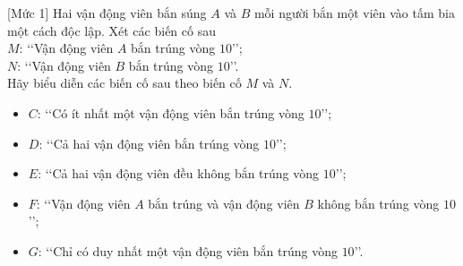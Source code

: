 \begin{bt}%
[Mức 1]
	Hai vận động viên bắn súng $A$ và $B$ mỗi người bắn một viên vào tấm bia một cách độc lập. Xét các biến  cố sau\\
	$M$: \lq\lq Vận động viên $A$ bắn trúng vòng $10$\rq\rq;\\
	$N$: \lq\lq Vận động viên $B$ bắn trúng vòng $10$\rq\rq.\\
	Hãy biểu diễn các biến cố sau theo biến cố $M$ và $N$.
	\begin{itemize}
		\item $C$: \lq\lq Có ít nhất một vận động viên bắn trúng vòng $10$\rq\rq;
		\item $D$: \lq\lq Cả hai vận động viên bắn trúng vòng $10$\rq\rq;
		\item $E$: \lq\lq Cả hai vận động viên đều không bắn trúng vòng $10$\rq\rq;
		\item $F$: \lq\lq Vận động viên $A$ bắn trúng và vận động viên $B$ không bắn trúng vòng $10$\rq\rq;
		\item  $G$: \lq\lq Chỉ có duy nhất một vận động viên bắn trúng vòng $10$\rq\rq.
	\end{itemize}
\end{bt}

